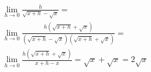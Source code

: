 \begin{ex}
\begin{align}
&\lim_{h\rightarrow 0} \frac{h}{\sqrt{x+h}-\sqrt{x}}=\nonumber\\
&\lim_{h\rightarrow 0} \frac{h(\sqrt{x+h}+\sqrt{x})}{(\sqrt{x+h}-\sqrt{x})(\sqrt{x+h}+\sqrt{x})}=\nonumber\\
&\lim_{h\rightarrow 0} \frac{h(\sqrt{x+h}+\sqrt{x})}{x+h-x}=\sqrt{x}+\sqrt{x}=2\sqrt{x}\nonumber
\end{align}
\end{ex}
